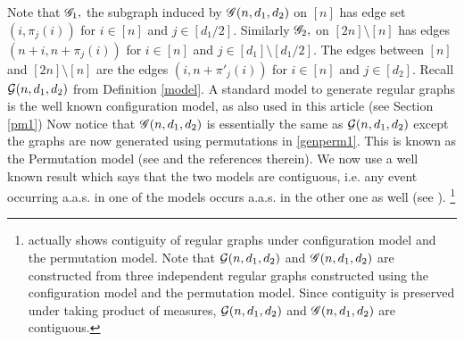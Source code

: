 \documentclass[11pt,reqno]{amsart}
\begin{document}
Note that $\mathscr{G}_1,$ the subgraph induced by $\mathscr{G}(n,d_1,d_2)$ on $[n]$ has edge set $(i,\pi_{j}(i))$ for $i\in [n]$ and $j\in [d_1/2]$. Similarly $\mathscr{G}_2,$ on $[2n]\setminus [n]$ has edges $(n+i,n+\pi_{j}(i))$ for $i\in [n]$ and $j\in [d_1]\setminus [d_1/2]$.
The edges between $[n]$ and $[2n]\setminus [n]$ are the edges $(i,n+\pi'_{j}(i))$ for $i\in [n]$ and $j\in [d_2].$
Recall $\mathcal{G}(n,d_1,d_2)$ from Definition \ref{model}.  A standard model to generate regular graphs is the well known configuration
model, as also used in this article (see Section \ref{pm1})
Now notice that $\mathscr{G}(n,d_1,d_2)$ is essentially the same as
$\mathcal{G}(n,d_1,d_2)$ except the graphs are now generated using
permutations in \eqref{genperm1}.  This is known as the Permutation
model (see \cite{F08} and the references therein). 
We now use a well known result which says that the two models are
contiguous, i.e. any event occurring a.a.s. in one of the models occurs
a.a.s. in the other one as well (see \cite{GJKW02}).
\footnote{\cite[Theorem $1.3$]{GJKW02} actually shows contiguity of regular graphs under configuration model and the permutation model. Note that $\mathcal{G}(n,d_1,d_2)$ and $\mathscr{G}(n,d_1,d_2)$ are  constructed  from three independent regular graphs constructed using the configuration model and the permutation model. Since contiguity is preserved under taking product of measures, $\mathcal{G}(n,d_1,d_2)$ and $\mathscr{G}(n,d_1,d_2)$ are contiguous.}
\end{document}
